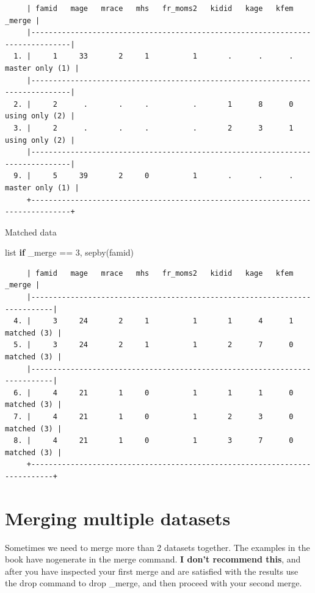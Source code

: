 \documentclass[
]{book}
\newenvironment{Shaded}{\begin{snugshade}}{\end{snugshade}}
\newcommand{\DataTypeTok}[1]{\textcolor[rgb]{0.13,0.29,0.53}{#1}}
\newcommand{\KeywordTok}[1]{\textcolor[rgb]{0.13,0.29,0.53}{\textbf{#1}}}
\newcommand{\NormalTok}[1]{#1}
\newcommand{\OtherTok}[1]{\textcolor[rgb]{0.56,0.35,0.01}{#1}}
\begin{document}
\begin{verbatim}
     | famid   mage   mrace   mhs   fr_moms2   kidid   kage   kfem            _merge |
     |-------------------------------------------------------------------------------|
  1. |     1     33       2     1          1       .      .      .   master only (1) |
     |-------------------------------------------------------------------------------|
  2. |     2      .       .     .          .       1      8      0    using only (2) |
  3. |     2      .       .     .          .       2      3      1    using only (2) |
     |-------------------------------------------------------------------------------|
  9. |     5     39       2     0          1       .      .      .   master only (1) |
     +-------------------------------------------------------------------------------+
\end{verbatim}

Matched data

\begin{Shaded}
\begin{Highlighting}[]
\OtherTok{list} \KeywordTok{if} \DataTypeTok{\_merge}\NormalTok{ == 3, sepby(famid)}
\end{Highlighting}
\end{Shaded}

\begin{verbatim}
     | famid   mage   mrace   mhs   fr_moms2   kidid   kage   kfem        _merge |
     |---------------------------------------------------------------------------|
  4. |     3     24       2     1          1       1      4      1   matched (3) |
  5. |     3     24       2     1          1       2      7      0   matched (3) |
     |---------------------------------------------------------------------------|
  6. |     4     21       1     0          1       1      1      0   matched (3) |
  7. |     4     21       1     0          1       2      3      0   matched (3) |
  8. |     4     21       1     0          1       3      7      0   matched (3) |
     +---------------------------------------------------------------------------+
\end{verbatim}

\section{Merging multiple datasets}\label{merging-multiple-datasets}

Sometimes we need to merge more than 2 datasets together. The examples in the book have nogenerate in the merge command. \textbf{I don't recommend this}, and after you have inspected your first merge and are satisfied with the results use the drop command to drop \_merge, and then proceed with your second merge.
\end{document}
